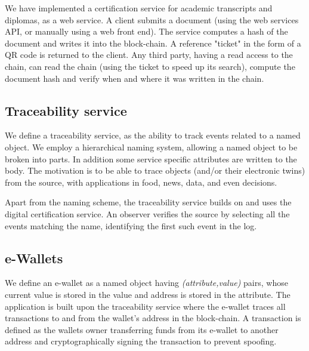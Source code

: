 \documentclass[10pt]{article}
\begin{document}
We have implemented a certification service for academic transcripts and diplomas, as a web service. A client submits a document (using the web services API, or manually using a web front end). The service computes a hash of the document and writes it into the block-chain. A reference "ticket" in the form of a QR code is returned to the client. Any third party, having a read access to the chain, can read the chain (using the ticket to speed up its search), compute the document hash and verify when and where it was written in the chain.


\subsection{Traceability service}
We define a traceability service, as the ability to track events related to a named object. We employ a hierarchical naming system, allowing a named object to be broken into parts. In addition some service specific attributes are written to the body. The motivation is to be able to trace objects (and/or their electronic twins) from the source, with applications in food, news, data, and even decisions.

Apart from the naming scheme, the traceability service builds on and uses the digital certification service. An observer verifies the source by selecting all the events matching the name, identifying the first such event in the log.

\subsection{e-Wallets}

We define an e-wallet as a named object having \emph{(attribute,value)} pairs, whose current value is stored in the value and address is stored in the attribute. The application is built upon the traceability service where the e-wallet traces all transactions to and from the wallet's address in the block-chain. A transaction is defined as the wallets owner transferring funds from its e-wallet to another address and cryptographically signing the transaction to prevent spoofing. 
\end{document}
